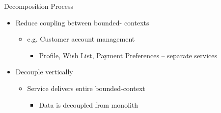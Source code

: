 \documentclass{slide}
\begin{document}
\begin{frame}{Decomposition Process}
\vspace{1pt}
{\huge
\begin{itemize}
    \item Reduce coupling between bounded- contexts
    \vspace{2mm}
    \begin{itemize}
        \LARGE\item e.g. Customer account management
        \begin{itemize}
            \Large\item Profile, Wish List, Payment Preferences -- separate services
        \end{itemize}
    \end{itemize}
    \vspace{2mm}
    \item Decouple vertically
    \vspace{1mm}
    \begin{itemize}
        \LARGE\item Service delivers entire bounded-context
        \begin{itemize}
            \Large\item Data is decoupled from monolith
        \end{itemize}
    \end{itemize}
\end{itemize}
}
\end{frame}
\end{document}
